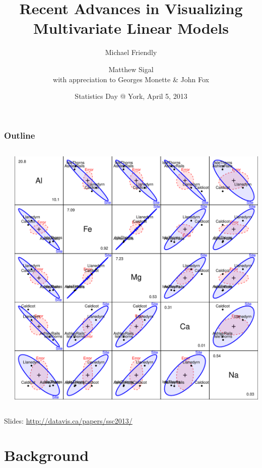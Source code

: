 \documentclass[10pt,t]{beamer}
\title{\small{Recent Advances in Visualizing Multivariate Linear Models}}
\author[Friendly, Sigal]{Michael Friendly \and Matthew Sigal
   \\ with appreciation to Georges Monette \& John Fox}
\date[SSC] %
{Statistics Day @ York, April 5, 2013}
\begin{document}
\begin{frame}
\titlepage
\end{frame}

\begin{frame}
  \frametitle{Outline}
	\begin{columns}[c]
	  \begin{column}{.6\textwidth}
	  \tableofcontents
	  \end{column}
	  \begin{column}{.4\textwidth}
	  \includegraphics[width=\textwidth]{figures/pottery-HE3}
	  \end{column}
	\end{columns}
	\begin{center}
	  Slides: \url{http://datavis.ca/papers/ssc2013/}
	\end{center}
\end{frame}

\section{Background}

\end{document}
